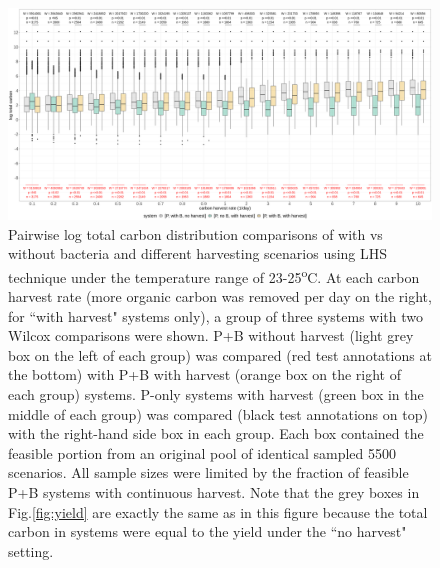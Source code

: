 \documentclass[../thesis.tex]{subfiles} %
\begin{document}
\begin{figure}[H]
    \centering
    \includegraphics[width=\linewidth]{../result/totC.png}
    \caption[Pairwise log total carbon]{Pairwise log total carbon distribution comparisons of with vs without bacteria and different harvesting scenarios using LHS technique under the temperature range of 23-25\textsuperscript{o}C.  {\scriptsize At each carbon harvest rate (more organic carbon was removed per day on the right, for ``with harvest" systems only), a group of three systems with two Wilcox comparisons were shown.  P+B without harvest (light grey box on the left of each group) was compared (red test annotations at the bottom) with P+B with harvest (orange box on the right of each group) systems.  P-only systems with harvest (green box in the middle of each group) was compared (black test annotations on top) with the right-hand side box in each group.  Each box contained the feasible portion from an original pool of identical sampled 5500 scenarios.  All sample sizes were limited by the fraction of feasible P+B systems with continuous harvest.  Note that the grey boxes in Fig.\ref{fig:yield} are exactly the same as in this figure because the total carbon in systems were equal to the yield under the ``no harvest" setting.}}
    \label{fig:totC}
\end{figure}
\end{document}
